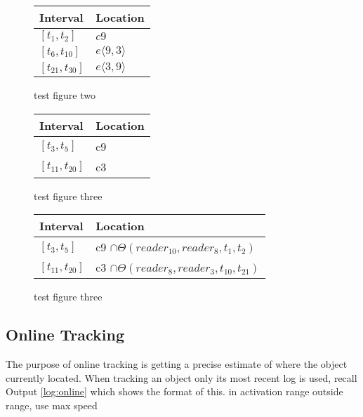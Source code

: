 \begin{figure}
\begin{minipage}[tbh]{\columnwidth}

  \vspace*{\fill}
  \centering
		\begin{tabular}{ l  l  }
		\toprule
		\textbf{Interval} & \textbf{Location}\\ 
		\midrule
		$[t_1,t_2]$ & $c9$ \\ 

		$[t_6,t_{10}]$ &  $e\langle9,3\rangle$\\ 

		$[t_{21},t_{30}]$ &  $ e\langle3,9\rangle $\\ 
		\bottomrule
		\end{tabular}
  \caption{test figure two}
  \label{fig:test2} \par\vfill
	
	
		\begin{tabular}{  l  l  }
		\toprule
		\textbf{Interval} & \textbf{Location}\\ 
		\midrule
		$[t_3,t_5]$ & c9 \\ 

		$[t_{11},t_{20}]$ &  c3\\ 
		\bottomrule
		\end{tabular}
  \caption{test figure three}
  \label{fig:test3}
	
		\begin{tabular}{  l  l  }
		\toprule
		\textbf{Interval} & \textbf{Location}\\ 
		\midrule
		$[t_3,t_5]$ & c9 $\cap \Theta(reader_10,reader_8,t_1,t_2)$ \\ 

		$[t_{11},t_{20}]$ &  c3 $\cap \Theta(reader_8,reader_3,t_{10},t_{21})$\\ 
		\hline
		\end{tabular}
			
	\caption{test figure three}
  \label{fig:test3}

\end{minipage}
\end{figure}


   


\subsection{Online Tracking}
\label{sub:online}
The purpose of online tracking is getting a precise estimate of where the object currently located.
When tracking an object only its most recent log is used, recall Output \ref{log:online} which shows the format of this.
in activation range
outside range, use max speed
